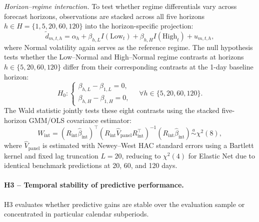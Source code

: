 \documentclass[12pt,twoside]{ord}
\begin{document}
\textit{Horizon--regime interaction.} To test whether regime differentials vary across forecast horizons, observations are stacked across all five horizons $h\in H=\{1,5,20,60,120\}$ into the horizon-specific projection:
\begin{equation}
\widetilde d_{m,t,h}
=
\alpha_h+\beta_{h,L}I(\mathrm{Low}_t)
+\beta_{h,H}I(\mathrm{High}_t)+u_{m,t,h},
\end{equation}
where Normal volatility again serves as the reference regime. The null hypothesis tests whether the Low--Normal and High--Normal regime contrasts at horizons $h\in\{5,20,60,120\}$ differ from their corresponding contrasts at the 1-day baseline horizon:
\begin{equation}
H_0:
\begin{cases}
\beta_{h,L}-\beta_{1,L}=0,\\
\beta_{h,H}-\beta_{1,H}=0,
\end{cases}
\quad
\forall h\in\{5,20,60,120\}.
\end{equation}
The Wald statistic jointly tests these eight contrasts using the stacked five-horizon GMM/OLS covariance estimator:
\begin{equation}
W_{\mathrm{int}}
=
(R_{\mathrm{int}}\widehat\beta_{\mathrm{int}})^\top
\left(
R_{\mathrm{int}}\widehat V_{\mathrm{panel}}
R_{\mathrm{int}}^\top
\right)^{-1}
(R_{\mathrm{int}}\widehat\beta_{\mathrm{int}})
\overset{a}{\sim}\chi^2(8),
\end{equation}
where $\widehat V_{\mathrm{panel}}$ is estimated with Newey--West HAC standard errors using a Bartlett kernel and fixed lag truncation $L=20$, reducing to $\chi^2(4)$ for Elastic Net due to identical benchmark predictions at 20, 60, and 120 days.

\paragraph{H3 -- Temporal stability of predictive performance.} H3 evaluates whether predictive gains are stable over the evaluation sample or concentrated in particular calendar subperiods.
\end{document}
